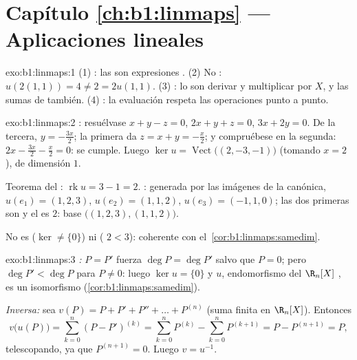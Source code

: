 \section*{Capítulo \ref{ch:b1:linmaps} --- Aplicaciones lineales}

\begin{solution}{exo:b1:linmaps:1}
(1) : las  son expresiones . (2) No
: $u(2(1,1)) = 4 \neq 2 = 2u(1,1)$. (3) : lo son
derivar y multiplicar por $X$, y las sumas de 
también. (4) : la evaluación respeta las operaciones punto a
punto.
\end{solution}

\begin{solution}{exo:b1:linmaps:2}
: resuélvase $x + y - z = 0$, $2x + y + z = 0$, $3x + 2y = 0$.
De la tercera, $y = -\frac{3x}{2}$; la primera da $z = x + y =
-\frac x2$; y compruébese en la segunda:
$2x - \frac{3x}{2} - \frac x2 = 0$: se cumple. Luego
$\ker u = \operatorname{Vect}\bigl((2, -3, -1)\bigr)$ (tomando
$x = 2$), de dimensión $1$.

Teorema del : $\operatorname{rk} u = 3 - 1 = 2$. :
generada por las imágenes de la  canónica, $u(e_1) = (1,2,3)$,
$u(e_2) = (1,1,2)$, $u(e_3) = (-1,1,0)$; las dos primeras son
 y el  es $2$: base $\bigl((1,2,3), (1,1,2)\bigr)$.

No es  ($\ker \neq \{0\}$) ni  (
$2 < 3$): coherente con el~\cref{cor:b1:linmaps:samedim}.
\end{solution}

\begin{solution}{exo:b1:linmaps:3}
\emph{:} $P = P'$ fuerza $\deg P = \deg P'$ salvo que
$P = 0$; pero $\deg P' < \deg P$ para $P \neq 0$: luego
$\ker u = \{0\}$ y $u$, endomorfismo  del $\R_n[X]$ , es un isomorfismo
(\cref{cor:b1:linmaps:samedim}).

\emph{Inversa:} sea $v(P) = P + P' + P'' + \dots + P^{(n)}$ (suma
finita en $\R_n[X]$). Entonces
\[
v\bigl(u(P)\bigr) = \sum_{k=0}^{n} (P - P')^{(k)}
= \sum_{k=0}^{n} P^{(k)} - \sum_{k=0}^{n} P^{(k+1)}
= P - P^{(n+1)} = P ,
\]
telescopando, ya que $P^{(n+1)} = 0$. Luego $v = u^{-1}$.
\end{solution}

